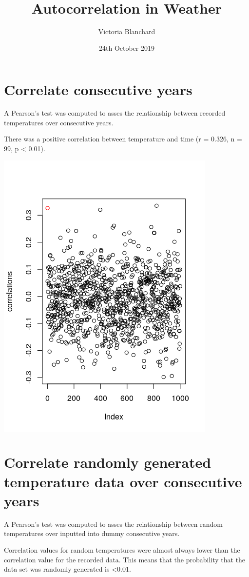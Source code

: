 \documentclass[12pt]{article}
\title{Autocorrelation in Weather}
\author{Victoria Blanchard}
\date{24th October 2019}
\begin{document}
    \maketitle

    \section{Correlate consecutive years}
        A Pearson's test was computed to asses the relationship between recorded temperatures over consecutive years. 

        There was a positive correlation between temperature and time (r = 0.326, n = 99, p < 0.01). 

        \includegraphics{Correlates.png}

    \section{Correlate randomly generated temperature data over consecutive years}
        A Pearson's test was computed to asses the relationship between random temperatures over inputted into dummy consecutive years. 

        Correlation values for random temperatures were almost always lower than the correlation value for the recorded data. This means that the probability that the data set was randomly generated is <0.01. 
\end{document}
